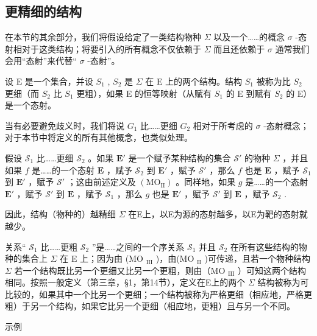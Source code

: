 \subsection{更精细的结构}

在本节的其余部分，我们将假设给定了一类结构物种 \(\Sigma\) 以及一个……的概念 \(\sigma\) -态射相对于这类结构；将要引入的所有概念不仅依赖于 \(\Sigma\) 而且还依赖于 \(\sigma\) 通常我们会用“态射”来代替“ \(\sigma\) -态射''。

设 E 是一个集合，并设 \(S_{1}\) , \(S_{2}\) 是 \(\Sigma\) 在 E 上的两个结构。结构 \(S_{1}\) 被称为比 \(S_{2}\) 更细（而 \(S_{2}\) 比 \(S_{1}\) 更粗），如果 E 的恒等映射（从赋有 \(S_{1}\) 的 E 到赋有 \(S_{2}\) 的 E）是一个态射。

当有必要避免歧义时，我们将说 \(G_{1}\) 比……更细 \(G_{2}\) 相对于所考虑的 \(\sigma\) -态射概念；对于本节中将定义的所有其他概念，也类似处理。

假设 \(\mathcal{S}_1\) 比……更细 \(\mathcal{S}_2\) 。如果 \(\mathbf{E}'\) 是一个赋予某种结构的集合 \(\mathcal{S}'\) 的物种 \(\Sigma\) ，并且如果 \(f\) 是……的一个态射 \(\mathbf{E}\) ，赋予 \(\mathcal{S}_2\) 到 \(\mathbf{E}'\) ，赋予 \(\mathcal{S}'\) ，那么 \(f\) 也是 \(\mathbf{E}\) ，赋予 \(\mathcal{S}_1\) 到 \(\mathbf{E}'\) ，赋予 \(\mathcal{S}'\) ；这由前述定义及 \((\mathrm{MO}_{\mathrm{II}})\) 。同样地，如果 \(g\) 是……的一个态射 \(\mathbf{E}'\) ，赋予 \(\mathcal{S}'\) 到 \(\mathbf{E}\) ，赋予 \(\mathcal{S}_1\) ，那么 \(g\) 也是 \(\mathbf{E}'\) ，赋予 \(\mathcal{S}'\) 到 \(\mathbf{E}\) ，赋予 \(\mathcal{S}_2\) .

因此，结构（物种的）越精细 \(\Sigma\) 在E上，以E为源的态射越多，以E为靶的态射就越少。

关系“ \(\mathcal{S}_{1}\) 比……更粗 \(\mathcal{S}_{2}\) ”是……之间的一个序关系 \(\mathcal{S}_{1}\) 并且 \(\mathcal{S}_{2}\) 在所有这些结构的物种的集合上 \(\Sigma\) 在 E 上；因为由 (MO \(_{\text{III}}\) )，由(MO \(_{\text{II}}\) )可传递，且若一个物种结构 \(\Sigma\) 若一个结构既比另一个更细又比另一个更粗，则由（MO \(_{\text{III}}\) ）可知这两个结构相同。按照一般定义（第三章，§1，第14节），定义在E上的两个 \(\Sigma\) 结构被称为可比较的，如果其中一个比另一个更细；一个结构被称为严格更细（相应地，严格更粗）于另一个结构，如果它比另一个更细（相应地，更粗）且与另一个不同。

示例

